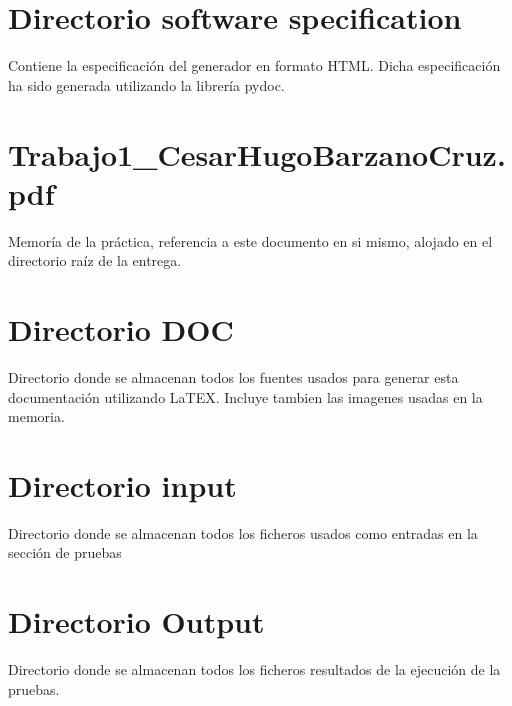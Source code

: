 \documentclass[a4paper,11pt]{book}
\begin{document}
\section{Directorio software specification}
Contiene la especificación del generador en formato HTML. Dicha especificación ha sido generada utilizando la librería pydoc. 

\section{Trabajo1\_CesarHugoBarzanoCruz.pdf}
Memoría de la práctica, referencia a este documento en si mismo, alojado en el directorio raíz de la entrega. 

\section{Directorio DOC}
Directorio donde se almacenan todos los fuentes usados para generar esta documentación utilizando LaTEX. Incluye tambien las imagenes usadas en la memoria. 

\section{Directorio input}
Directorio donde se almacenan todos los ficheros usados como entradas en la sección de pruebas

\section{Directorio Output}
Directorio donde se almacenan todos los ficheros resultados de la ejecución de la pruebas. 

 
\end{document}
